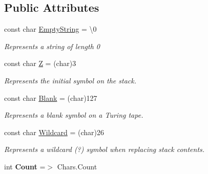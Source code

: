 \subsection*{Public Attributes}
\begin{DoxyCompactItemize}
\item 
const char \mbox{\hyperlink{class_system_1_1_automata_1_1_alphabet_aa3f8c16de4596ed24f2fe0fb77e7493c}{Empty\+String}} = \textquotesingle{}\textbackslash{}0\textquotesingle{}
\begin{DoxyCompactList}\small\item\em Represents a string of length 0 \end{DoxyCompactList}\item 
const char \mbox{\hyperlink{class_system_1_1_automata_1_1_alphabet_a1c103a38506cc7b398a6974baa5ead67}{Z}} = (char)3
\begin{DoxyCompactList}\small\item\em Represents the initial symbol on the stack. \end{DoxyCompactList}\item 
const char \mbox{\hyperlink{class_system_1_1_automata_1_1_alphabet_a16131b03673f7d6389ca4ac943881848}{Blank}} = (char)127
\begin{DoxyCompactList}\small\item\em Represents a blank symbol on a Turing tape. \end{DoxyCompactList}\item 
const char \mbox{\hyperlink{class_system_1_1_automata_1_1_alphabet_a8aa33ab3472191b4ff0234791718af25}{Wildcard}} = (char)26
\begin{DoxyCompactList}\small\item\em Represents a wildcard (?) symbol when replacing stack contents. \end{DoxyCompactList}\item 
\mbox{\label{class_system_1_1_automata_1_1_alphabet_aec0745b87eb975303a875b829e8cc412}} 
int {\bfseries Count} =$>$ Chars.\+Count
\end{DoxyCompactItemize}
